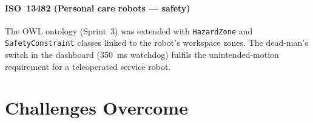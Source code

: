 \documentclass[conference]{IEEEtran}
\begin{document}
\paragraph{ISO~13482 (Personal care robots --- safety)}
The OWL ontology (Sprint~3) was extended with
\texttt{HazardZone} and \texttt{SafetyConstraint} classes linked to
the robot's workspace zones. The dead-man's switch in the dashboard
(350~ms watchdog) fulfils the unintended-motion requirement for a
teleoperated service robot.

\section{Challenges Overcome}
\label{sec:challenges}
\end{document}
